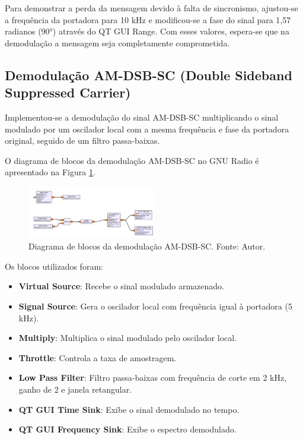 Para demonstrar a perda da mensagem devido à falta de sincronismo, ajustou-se a frequência da portadora para 10 kHz e modificou-se a fase do sinal para 1,57 radianos (90°) através do QT GUI Range. Com esses valores, espera-se que na demodulação a mensagem seja completamente comprometida.

\subsection{Demodulação AM-DSB-SC (Double Sideband Suppressed Carrier)}

Implementou-se a demodulação do sinal AM-DSB-SC multiplicando o sinal modulado por um oscilador local com a mesma frequência e fase da portadora original, seguido de um filtro passa-baixas.

O diagrama de blocos da demodulação AM-DSB-SC no GNU Radio é apresentado na Figura \ref{fig:demodulacao_am_sc_gnu}.

\begin{figure}
    \centering
    \includegraphics[width=0.5\textwidth]{images/demodulacao_gnu_am_dscb_sc.png}
    \caption{Diagrama de blocos da demodulação AM-DSB-SC. Fonte: Autor.}
    \label{fig:demodulacao_am_sc_gnu}
\end{figure}

Os blocos utilizados foram:

\begin{itemize}
    \item \textbf{Virtual Source}: Recebe o sinal modulado armazenado.
    \item \textbf{Signal Source}: Gera o oscilador local com frequência igual à portadora (5 kHz).
    \item \textbf{Multiply}: Multiplica o sinal modulado pelo oscilador local.
    \item \textbf{Throttle}: Controla a taxa de amostragem.
    \item \textbf{Low Pass Filter}: Filtro passa-baixas com frequência de corte em 2 kHz, ganho de 2 e janela retangular.
    \item \textbf{QT GUI Time Sink}: Exibe o sinal demodulado no tempo.
    \item \textbf{QT GUI Frequency Sink}: Exibe o espectro demodulado.
\end{itemize}

